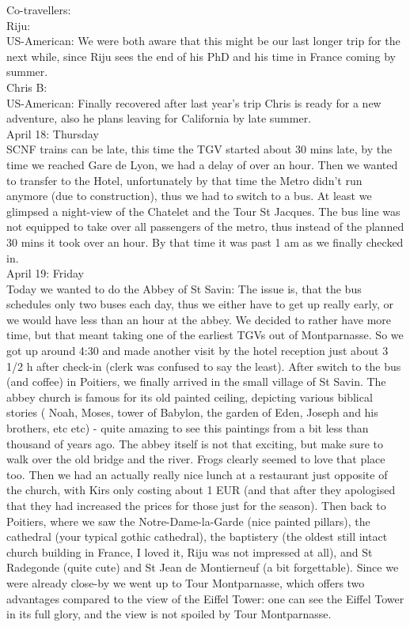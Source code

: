Co-travellers:\\
Riju:\\
US-American: We were both aware that this might be our last longer trip for the next while, since Riju sees the end of his PhD and his time in France coming by summer.\\

Chris B:\\
US-American: Finally recovered after last year's trip Chris is ready for a new adventure, also he plans leaving for California by late summer.\\

April 18: Thursday\\
SCNF trains can be late, this time the TGV started about 30 mins late, by the time we reached Gare de Lyon, we had a delay of over an hour. Then we wanted to transfer to the Hotel, unfortunately by that time the Metro didn't run anymore (due to construction), thus we had to switch to a bus. At least we glimpsed a night-view of the Chatelet and the Tour St Jacques. The bus line was not equipped to take over all passengers of the metro, thus instead of the planned 30 mins it took over an hour. By that time it was past 1 am as we finally checked in.\\

April 19: Friday\\
Today we wanted to do the Abbey of St Savin: The issue is, that the bus schedules only two buses each day, thus we either have to get up really early, or we would have less than an hour at the abbey. We decided to rather have more time, but that meant taking one of the earliest TGVs out of Montparnasse. So we got up around 4:30 and made another visit by the hotel reception just about 3 1/2 h after check-in (clerk was confused to say the least). After switch to the bus (and coffee) in Poitiers, we finally arrived in the small village of St Savin. The abbey church is famous for its old painted ceiling, depicting various biblical stories ( Noah, Moses, tower of Babylon, the garden of Eden, Joseph and his brothers, etc etc) - quite amazing to see this paintings from a bit less than thousand of years ago. The abbey itself is not that exciting, but make sure to walk over the old bridge and the river. Frogs clearly seemed to love that place too. Then we had an actually really nice lunch at a restaurant just opposite of the church, with Kirs only costing about 1 EUR (and that after they apologised that they had increased the prices for those just for the season). Then back to Poitiers, where we saw the Notre-Dame-la-Garde (nice painted pillars), the cathedral (your typical gothic cathedral), the baptistery (the oldest still intact church building in France, I loved it, Riju was not impressed at all), and St Radegonde (quite cute) and St Jean de Montierneuf (a bit forgettable). Since we were already close-by we went up to Tour Montparnasse, which offers two advantages compared to the view of the Eiffel Tower: one can see the Eiffel Tower in its full glory, and the view is not spoiled by Tour Montparnasse. \\

